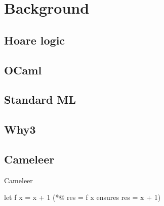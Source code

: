 
%


\chapter{Background}
\label{cha:Background}


\section{Hoare logic}
\label{sec:Hoare_logic}

\section{OCaml}
\label{sec:OCaml}

\section{Standard ML}
\label{sec:Standard_ML}

\section{Why3}
\label{sec:Why3}

\section{Cameleer}
\label{sec:Cameleer}

Cameleer ~\cite{PereiraR20}

\begin{gospell}
  let f x = x + 1 (*@ res = f x ensures res = x + 1)
\end{gospell}